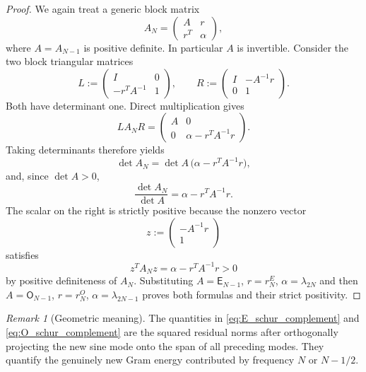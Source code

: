 \documentclass[11pt]{amsart}
\numberwithin{equation}{section}
\theoremstyle{plain}
\theoremstyle{definition}
\theoremstyle{remark}
\newtheorem{remark}[theorem]{Remark}
\newcommand{\E}{\mathsf E}
\newcommand{\Omat}{\mathsf O}
\begin{document}
\begin{proof}
We again treat a generic block matrix
\begin{equation}
A_N=\begin{pmatrix}A&r\\r^T&\alpha\end{pmatrix},
\end{equation}
where $A=A_{N-1}$ is positive definite.  In particular $A$ is invertible.  Consider the two block triangular matrices
\begin{equation}
L:=\begin{pmatrix}I&0\\-r^TA^{-1}&1\end{pmatrix},
\qquad
R:=\begin{pmatrix}I&-A^{-1}r\\0&1\end{pmatrix}.
\end{equation}
Both have determinant one.  Direct multiplication gives
\begin{equation}
LA_NR=
\begin{pmatrix}
A&0\\
0&\alpha-r^TA^{-1}r
\end{pmatrix}.
\end{equation}
Taking determinants therefore yields
\begin{equation}
\det A_N=\det A\,\bigl(\alpha-r^TA^{-1}r\bigr),
\end{equation}
and, since $\det A>0$,
\begin{equation}
\frac{\det A_N}{\det A}=\alpha-r^TA^{-1}r.
\end{equation}
The scalar on the right is strictly positive because the nonzero vector
\begin{equation}
z:=\begin{pmatrix}-A^{-1}r\\1\end{pmatrix}
\end{equation}
satisfies
\begin{equation}
z^TA_Nz=\alpha-r^TA^{-1}r>0
\end{equation}
by positive definiteness of $A_N$.  Substituting $A=\E_{N-1}$, $r=r_N^E$, $\alpha=\lambda_{2N}$ and then $A=\Omat_{N-1}$, $r=r_N^O$, $\alpha=\lambda_{2N-1}$ proves both formulas and their strict positivity.
\end{proof}

\begin{remark}[Geometric meaning]
\label{rem:schur_geometry}
The quantities in \eqref{eq:E_schur_complement} and \eqref{eq:O_schur_complement} are the squared residual norms after orthogonally projecting the new sine mode onto the span of all preceding modes. They quantify the genuinely new Gram energy contributed by frequency $N$ or $N-1/2$.
\end{remark}
\end{document}
